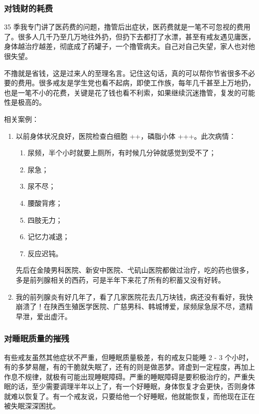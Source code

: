 \documentclass{ctexart}
\begin{document}
\subsubsection{对钱财的耗费}

35 季我专门讲了医药费的问题，撸管后出症状，医药费就是一笔不可忽视的费用了。很多人几千乃至几万地往外扔，但扔下去都打了水漂，甚至有戒友遇见庸医，身体越治疗越差，彻底成了药罐子，一个撸管病夫。自己对自己失望，家人也对他很失望。

不撸就是省钱，这是过来人的至理名言。记住这句话，真的可以帮你节省很多不必要的费用。很多戒友是学生党也看不起病，即使工作族，每年几千甚至上万地扔，也是一笔不小的花费，关键是花了钱也看不利索，如果继续沉迷撸管，复发的可能性是极高的。

相关案例：

\begin{enumerate}
    \item 以前身体状况良好，医院检查白细胞 ++，磷脂小体 +++。此次病情：\begin{enumerate}
        \item 尿频，半个小时就要上厕所，有时候几分钟就感觉到受不了；
        \item 尿急；
        \item 尿不尽；
        \item 腰酸背疼；
        \item 四肢无力；
        \item 记忆力减退；
        \item 反应迟钝。
    \end{enumerate} 先后在金陵男科医院、新安中医院、弋矶山医院都做过治疗，吃的药也很多，多是前列腺相关的西药，可是半年下来花了所有的积蓄又没有好转。
    \item 我的前列腺炎有好几年了，看了几家医院花去几万块钱，病还没有看好，我快崩溃了！在陕西生殖医学医院、广慈男科、韩城博爱，尿频尿急尿不尽，遗精早泄，爱出虚汗。
\end{enumerate}

\subsubsection{对睡眠质量的摧残}

有些戒友虽然其他症状不严重，但睡眠质量极差，有的戒友只能睡 2 - 3 个小时，有的多梦易醒，有的干脆就失眠了，还有的则是做恶梦。肾虚到一定程度，再加上作息不规律，就极有可能出现睡眠障碍。严重的睡眠障碍是要积极治疗的，严重失眠的话，至少需要调理半年以上了，有一个好睡眠，身体恢复才会更快，否则身体就难以恢复了。有一个戒友说，只要给他一个好睡眠，他就能恢复，而他现在正在被失眠深深困扰。
\end{document}
